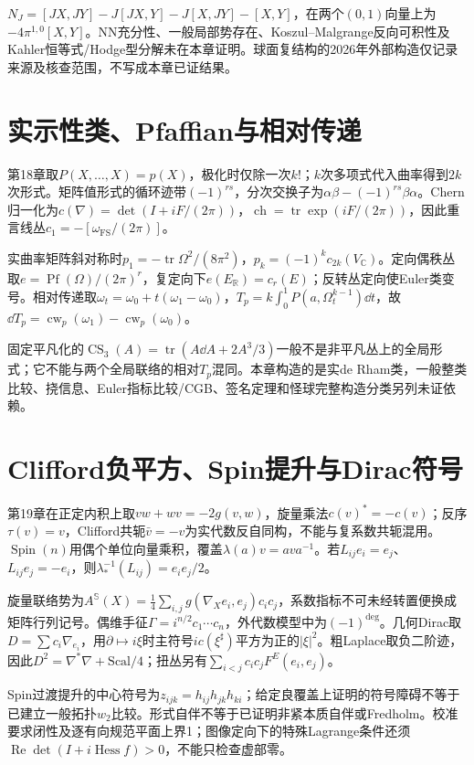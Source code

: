 $N_J=[JX,JY]-J[JX,Y]-J[X,JY]-[X,Y]$，在两个$(0,1)$向量上为$-4\pi^{1,0}[X,Y]$。NN充分性、一般局部势存在、Koszul--Malgrange反向可积性及Kahler恒等式/Hodge型分解未在本章证明。球面复结构的2026年外部构造仅记录来源及核查范围，不写成本章已证结果。

\section{实示性类、Pfaffian与相对传递}
第18章取$P(X,\ldots,X)=p(X)$，极化时仅除一次$k!$；$k$次多项式代入曲率得到$2k$次形式。矩阵值形式的循环迹带$(-1)^{rs}$，分次交换子为$\alpha\beta-(-1)^{rs}\beta\alpha$。Chern归一化为$c(\nabla)=\det(I+iF/(2\pi))$，$\operatorname{ch}=\operatorname{tr}\exp(iF/(2\pi))$，因此重言线丛$c_1=-[\omega_{\mathrm{FS}}/(2\pi)]$。

实曲率矩阵斜对称时$p_1=-\operatorname{tr}\Omega^2/(8\pi^2)$，$p_k=(-1)^kc_{2k}(V_{\mathbb C})$。定向偶秩丛取$e=\operatorname{Pf}(\Omega)/(2\pi)^r$，复定向下$e(E_{\mathbb R})=c_r(E)$；反转丛定向使Euler类变号。相对传递取$\omega_t=\omega_0+t(\omega_1-\omega_0)$，$T_p=k\int_0^1P(a,\Omega_t^{k-1})\dd t$，故$\dd T_p=\operatorname{cw}_p(\omega_1)-\operatorname{cw}_p(\omega_0)$。

固定平凡化的$\operatorname{CS}_3(A)=\operatorname{tr}(A\dd A+2A^3/3)$一般不是非平凡丛上的全局形式；它不能与两个全局联络的相对$T_p$混同。本章构造的是实de Rham类，一般整类比较、挠信息、Euler指标比较/CGB、签名定理和怪球完整构造分类另列未证依赖。

\section{Clifford负平方、Spin提升与Dirac符号}
第19章在正定内积上取$vw+wv=-2g(v,w)$，旋量乘法$c(v)^*=-c(v)$；反序$\tau(v)=v$，Clifford共轭$\bar v=-v$为实代数反自同构，不能与复系数共轭混用。$\operatorname{Spin}(n)$用偶个单位向量乘积，覆盖$\lambda(a)v=ava^{-1}$。若$L_{ij}e_i=e_j$、$L_{ij}e_j=-e_i$，则$\lambda_*^{-1}(L_{ij})=e_ie_j/2$。

旋量联络势为$A^{\mathbb S}(X)=\frac14\sum_{i,j}g(\nabla_Xe_i,e_j)c_ic_j$，系数指标不可未经转置便换成矩阵行列记号。偶维手征$\Gamma=i^{n/2}c_1\cdots c_n$，外代数模型中为$(-1)^{\deg}$。几何Dirac取$D=\sum c_i\nabla_{e_i}$，用$\partial\mapsto i\xi$时主符号$ic(\xi^\sharp)$平方为正的$|\xi|^2$。粗Laplace取负二阶迹，因此$D^2=\nabla^*\nabla+\mathrm{Scal}/4$；扭丛另有$\sum_{i<j}c_ic_jF^E(e_i,e_j)$。

Spin过渡提升的中心符号为$z_{ijk}=h_{ij}h_{jk}h_{ki}$；给定良覆盖上证明的符号障碍不等于已建立一般拓扑$w_2$比较。形式自伴不等于已证明非紧本质自伴或Fredholm。校准要求闭性及逐有向规范平面上界1；图像定向下的特殊Lagrange条件还须$\operatorname{Re}\det(I+i\operatorname{Hess}f)>0$，不能只检查虚部零。

